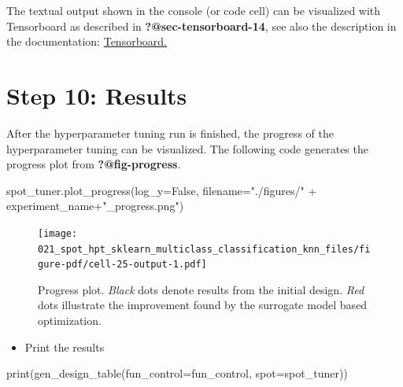 \documentclass[
  letterpaper,
  DIV=11,
  numbers=noendperiod]{scrreprt}
\newenvironment{Shaded}{\begin{snugshade}}{\end{snugshade}}
\newcommand{\BuiltInTok}[1]{\textcolor[rgb]{0.00,0.23,0.31}{#1}}
\newcommand{\NormalTok}[1]{\textcolor[rgb]{0.00,0.23,0.31}{#1}}
\newcommand{\OperatorTok}[1]{\textcolor[rgb]{0.37,0.37,0.37}{#1}}
\newcommand{\StringTok}[1]{\textcolor[rgb]{0.13,0.47,0.30}{#1}}
\newcommand{\VariableTok}[1]{\textcolor[rgb]{0.07,0.07,0.07}{#1}}
\providecommand{\tightlist}{%
  \setlength{\itemsep}{0pt}\setlength{\parskip}{0pt}}\usepackage{longtable,booktabs,array}
\begin{document}
The textual output shown in the console (or code cell) can be visualized
with Tensorboard as described in \textbf{?@sec-tensorboard-14}, see also
the description in the documentation:
\href{https://sequential-parameter-optimization.github.io/spotPython/14_spot_ray_hpt_torch_cifar10.html\#sec-tensorboard-14}{Tensorboard.}

\hypertarget{sec-results-tuning-19}{%
\section{Step 10: Results}\label{sec-results-tuning-19}}

After the hyperparameter tuning run is finished, the progress of the
hyperparameter tuning can be visualized. The following code generates
the progress plot from \textbf{?@fig-progress}.

\begin{Shaded}
\begin{Highlighting}[]
\NormalTok{spot\_tuner.plot\_progress(log\_y}\OperatorTok{=}\VariableTok{False}\NormalTok{,}
\NormalTok{    filename}\OperatorTok{=}\StringTok{"./figures/"} \OperatorTok{+}\NormalTok{ experiment\_name}\OperatorTok{+}\StringTok{"\_progress.png"}\NormalTok{)}
\end{Highlighting}
\end{Shaded}

\begin{figure}[H]

{\centering \texttt{[image: 021\_spot\_hpt\_sklearn\_multiclass\_classification\_knn\_files/figure-pdf/cell-25-output-1.pdf]}

}

\caption{Progress plot. \emph{Black} dots denote results from the
initial design. \emph{Red} dots illustrate the improvement found by the
surrogate model based optimization.}

\end{figure}

\begin{itemize}
\tightlist
\item
  Print the results
\end{itemize}

\begin{Shaded}
\begin{Highlighting}[]
\BuiltInTok{print}\NormalTok{(gen\_design\_table(fun\_control}\OperatorTok{=}\NormalTok{fun\_control,}
\NormalTok{    spot}\OperatorTok{=}\NormalTok{spot\_tuner))}
\end{Highlighting}
\end{Shaded}
\end{document}
